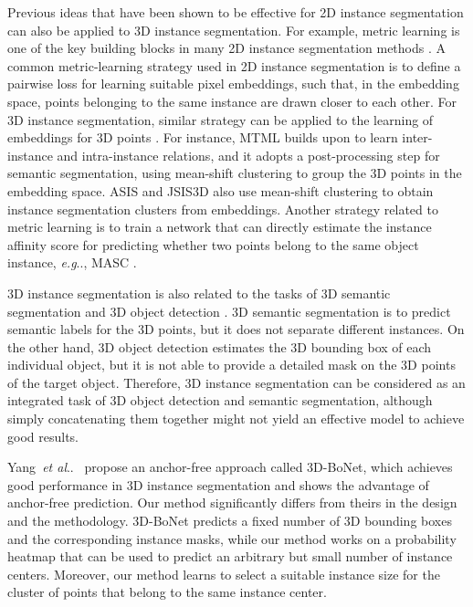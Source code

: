 \documentclass[runningheads]{llncs}
\makeatletter
\DeclareRobustCommand\onedot{\futurelet\@let@token\@onedot}
\def\@onedot{\ifx\@let@token.\else.\null\fi\xspace}
\def\eg{\emph{e.g}\onedot} \def\Eg{\emph{E.g}\onedot}
\def\etal{\emph{et al}\onedot}
\makeatother
\begin{document}
Previous ideas that have been shown to be effective for 2D instance segmentation can also be applied to 3D instance segmentation. 
For example, metric learning is one of the key building blocks in many 2D instance segmentation methods \cite{BrabandereNV17,KongF18a,LiangLWSYY18,NevenBPG19,NovotnyALV18}. A common metric-learning strategy used in 2D instance segmentation is to define a pairwise loss for learning suitable pixel embeddings, such that, in the embedding space, points belonging to the same instance are drawn closer to each other. For 3D instance segmentation, similar strategy can be applied to the learning of embeddings for 3D points \cite{LahoudGPO19,PhamNHRY19,WangLSSJ19}. For instance, MTML \cite{LahoudGPO19} builds upon \cite{BrabandereNV17} to learn inter-instance and intra-instance relations, and it adopts a post-processing step for semantic segmentation, using mean-shift clustering \cite{FukunagaH75} to group the 3D points in the embedding space. 
ASIS \cite{WangLSSJ19} and JSIS3D \cite{PhamNHRY19} also use mean-shift clustering to obtain instance segmentation clusters from embeddings. 
Another strategy related to metric learning is to train a network that can directly estimate the instance affinity score for predicting whether two points belong to the same object instance, \eg, MASC \cite{LiuF19}.

3D instance segmentation is also related to the tasks of 3D semantic segmentation \cite{ChiangLLH19,ChoyGS19,EngelmannKL19,GrahamEM18,WuQL19} and 3D object detection \cite{QiLHG19,QiLWSG18,SindagiZT19,ZhouT18}. 3D semantic segmentation is to predict semantic labels for the 3D points, but it does not separate different instances. On the other hand, 3D object detection estimates the 3D bounding box of each individual object, but it is not able to provide a detailed mask on the 3D points of the target object. Therefore, 3D instance segmentation can be considered as an integrated task of 3D object detection and semantic segmentation, although simply concatenating them together might not yield an effective model to achieve good results. 







Yang~\etal~\cite{YangWCHWMT19} propose an anchor-free approach called 3D-BoNet, which achieves good performance in 3D instance segmentation and shows the advantage of anchor-free prediction.
Our method significantly differs from theirs in the design and the methodology. 3D-BoNet predicts a fixed number of 3D bounding boxes and the corresponding instance masks, while our method works on a probability heatmap that can be used to predict an arbitrary but small number of instance centers. Moreover, our method learns to select a suitable instance size for the cluster of points that belong to the same instance center. 
\end{document}
